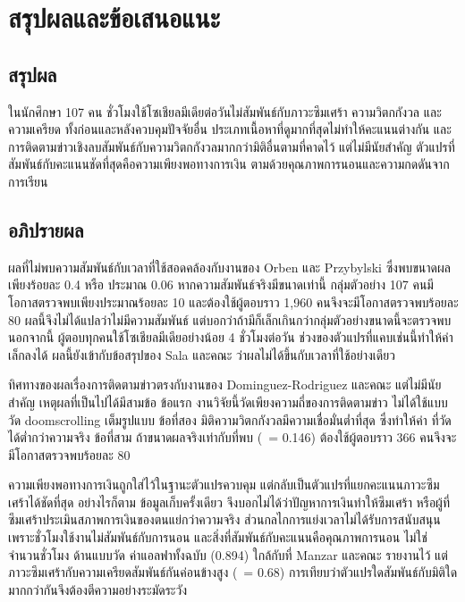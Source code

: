 \section{สรุปผลและข้อเสนอแนะ}

\subsection{สรุปผล}

ในนักศึกษา 107 คน ชั่วโมงใช้โซเชียลมีเดียต่อวันไม่สัมพันธ์กับภาวะซึมเศร้า ความวิตกกังวล
และความเครียด ทั้งก่อนและหลังควบคุมปัจจัยอื่น ประเภทเนื้อหาที่ดูมากที่สุดไม่ทำให้คะแนนต่างกัน
และการติดตามข่าวเชิงลบสัมพันธ์กับความวิตกกังวลมากกว่ามิติอื่นตามที่คาดไว้ แต่ไม่มีนัยสำคัญ
ตัวแปรที่สัมพันธ์กับคะแนนชัดที่สุดคือความเพียงพอทางการเงิน
ตามด้วยคุณภาพการนอนและความกดดันจากการเรียน

\subsection{อภิปรายผล}

ผลที่ไม่พบความสัมพันธ์กับเวลาที่ใช้สอดคล้องกับงานของ Orben และ Przybylski
\cite{orben2019association} ซึ่งพบขนาดผลเพียงร้อยละ 0.4 หรือ  ประมาณ 0.06
หากความสัมพันธ์จริงมีขนาดเท่านี้ กลุ่มตัวอย่าง 107 คนมีโอกาสตรวจพบเพียงประมาณร้อยละ 10
และต้องใช้ผู้ตอบราว 1,960 คนจึงจะมีโอกาสตรวจพบร้อยละ 80
ผลนี้จึงไม่ได้แปลว่าไม่มีความสัมพันธ์ แต่บอกว่าถ้ามีก็เล็กเกินกว่ากลุ่มตัวอย่างขนาดนี้จะตรวจพบ
นอกจากนี้ ผู้ตอบทุกคนใช้โซเชียลมีเดียอย่างน้อย 4 ชั่วโมงต่อวัน
ช่วงของตัวแปรที่แคบเช่นนี้ทำให้ค่า  เล็กลงได้
ผลนี้ยังเข้ากับข้อสรุปของ Sala และคณะ \cite{sala2024umbrella}
ว่าผลไม่ได้ขึ้นกับเวลาที่ใช้อย่างเดียว

ทิศทางของผลเรื่องการติดตามข่าวตรงกับงานของ Dominguez-Rodriguez และคณะ
\cite{dominguez2025climate} แต่ไม่มีนัยสำคัญ เหตุผลที่เป็นไปได้มีสามข้อ
ข้อแรก งานวิจัยนี้วัดเพียงความถี่ของการติดตามข่าว ไม่ได้ใช้แบบวัด doomscrolling เต็มรูปแบบ
ข้อที่สอง มิติความวิตกกังวลมีความเชื่อมั่นต่ำที่สุด ซึ่งทำให้ค่า  ที่วัดได้ต่ำกว่าความจริง
ข้อที่สาม ถ้าขนาดผลจริงเท่ากับที่พบ (~= 0.146)
ต้องใช้ผู้ตอบราว 366 คนจึงจะมีโอกาสตรวจพบร้อยละ 80

ความเพียงพอทางการเงินถูกใส่ไว้ในฐานะตัวแปรควบคุม
แต่กลับเป็นตัวแปรที่แยกคะแนนภาวะซึมเศร้าได้ชัดที่สุด
อย่างไรก็ตาม ข้อมูลเก็บครั้งเดียว จึงบอกไม่ได้ว่าปัญหาการเงินทำให้ซึมเศร้า
หรือผู้ที่ซึมเศร้าประเมินสภาพการเงินของตนแย่กว่าความจริง
ส่วนกลไกการแย่งเวลาไม่ได้รับการสนับสนุน เพราะชั่วโมงใช้งานไม่สัมพันธ์กับการนอน
และสิ่งที่สัมพันธ์กับคะแนนคือคุณภาพการนอน ไม่ใช่จำนวนชั่วโมง
ด้านแบบวัด ค่าแอลฟาทั้งฉบับ (0.894) ใกล้กับที่ Manzar และคณะ \cite{manzar2025dass21} รายงานไว้
แต่ภาวะซึมเศร้ากับความเครียดสัมพันธ์กันค่อนข้างสูง (~= 0.68)
การเทียบว่าตัวแปรใดสัมพันธ์กับมิติใดมากกว่ากันจึงต้องตีความอย่างระมัดระวัง

